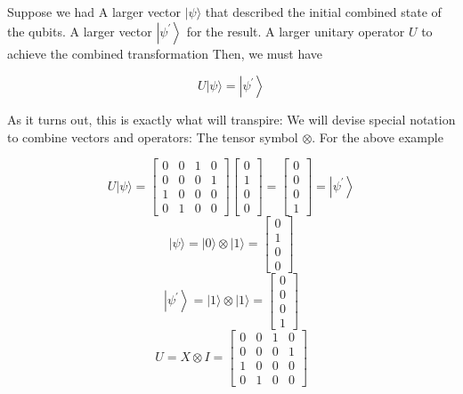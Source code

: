 \documentclass[main.tex]{subfiles}
\begin{document}
    Suppose we had A larger vector $|\psi\rangle$ that described the initial combined state of the qubits. A larger vector $\left|\psi^{\prime}\right\rangle$ for the result. A larger unitary operator $U$ to achieve the combined transformation Then, we must have
    
    $$
    U|\psi\rangle=\left|\psi^{\prime}\right\rangle
    $$
    
    As it turns out, this is exactly what will transpire: We will devise special notation to combine vectors and operators: The tensor symbol $\otimes$. For the above example
    
    $$
    U|\psi\rangle=\left[\begin{array}{llll}
    0 & 0 & 1 & 0 \\
    0 & 0 & 0 & 1 \\
    1 & 0 & 0 & 0 \\
    0 & 1 & 0 & 0
    \end{array}\right]\left[\begin{array}{l}
    0 \\
    1 \\
    0 \\
    0
    \end{array}\right]=\left[\begin{array}{l}
    0 \\
    0 \\
    0 \\
    1
    \end{array}\right]=\left|\psi^{\prime}\right\rangle
    $$
    $$
    |\psi\rangle=|0\rangle \otimes|1\rangle=\left[\begin{array}{l}
    0 \\
    1 \\
    0 \\
    0
    \end{array}\right]
    $$
    $$
    \left|\psi^{\prime}\right\rangle=|1\rangle \otimes|1\rangle=\left[\begin{array}{l}
    0 \\
    0 \\
    0 \\
    1
    \end{array}\right]
    $$
    $$
    U=X \otimes I=\left[\begin{array}{llll}
    0 & 0 & 1 & 0 \\
    0 & 0 & 0 & 1 \\
    1 & 0 & 0 & 0 \\
    0 & 1 & 0 & 0
    \end{array}\right]
    $$
    
\end{document}

